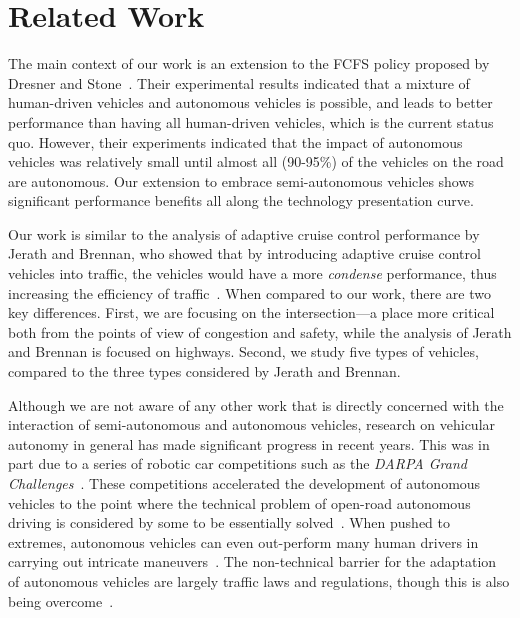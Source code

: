 \section{Related Work}
\label{sec:related}

The main context of our work is an extension to the FCFS policy
proposed by Dresner and Stone~\cite{bib:Dresner08Multiagent}. Their
experimental results indicated that a mixture of human-driven vehicles
and autonomous vehicles is possible, and leads to better performance
than having all human-driven vehicles, which is the current status
quo.  However, their experiments indicated that the impact of
autonomous vehicles was relatively small until almost all (90-95\%) of
the vehicles on the road are autonomous.  Our extension to embrace
semi-autonomous vehicles shows significant performance benefits all
along the technology presentation curve.

Our work is similar to the analysis of adaptive cruise control
performance by Jerath and Brennan, who showed that by introducing
adaptive cruise control vehicles into traffic, the vehicles would have
a more \textit{condense} performance, thus increasing the efficiency
of traffic~\cite{bib:Jerath10adaptive}.  When compared to our work,
there are two key differences.  First, we are focusing on the
intersection---a place more critical both from the points of view of
congestion and safety, while the analysis of Jerath and Brennan is
focused on highways.  Second, we study five types of vehicles,
compared to the three types considered by Jerath and Brennan.

Although we are not aware of any other work that is directly concerned
with the interaction of semi-autonomous and autonomous vehicles,
research on vehicular autonomy in general has made significant
progress in recent years.  This was in part due to a series of robotic
car competitions such as the \emph{DARPA Grand
Challenges}~\cite{DARPAGrandChallenge}.  These competitions
accelerated the development of autonomous vehicles to the point where
the technical problem of open-road autonomous driving is considered by
some to be essentially solved~\cite{bib:Dresner08Multiagent}.  When pushed to
extremes, autonomous vehicles can even out-perform many human drivers
in carrying out intricate maneuvers~\cite{Squatriglia2010}. The
non-technical barrier for the adaptation of autonomous vehicles are
largely traffic laws and regulations, though this is also being
overcome~\cite{calo2011-nevada}.

